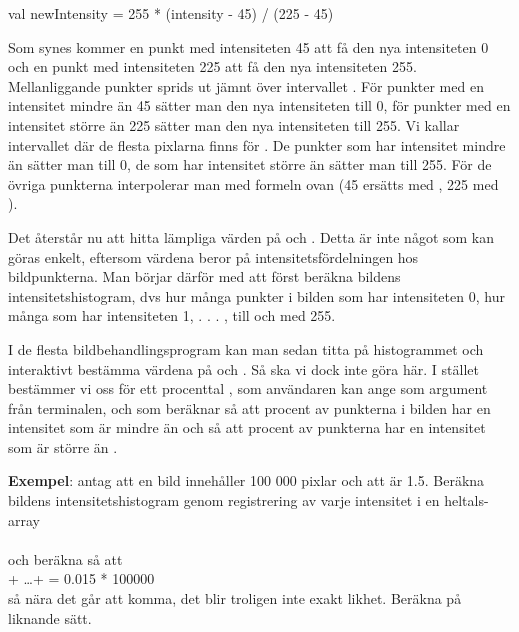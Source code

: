 \begin{Code}
val newIntensity = 255 * (intensity - 45) / (225 - 45)
\end{Code}

Som synes kommer en punkt med intensiteten 45 att få den nya intensiteten 0 och en punkt med intensiteten 225 att få den nya intensiteten 255. Mellanliggande punkter sprids ut jämnt över intervallet \code{[0, 255]}. För punkter med en intensitet mindre än 45 sätter man den nya intensiteten till 0, för punkter med en intensitet större än 225 sätter man den nya intensiteten till 255. Vi kallar intervallet där de flesta pixlarna finns för . De punkter som har intensitet mindre än  sätter man till 0, de som har intensitet större än  sätter man till 255. För de övriga punkterna interpolerar man med formeln ovan (45 ersätts med , 225 med ).

Det återstår nu att hitta lämpliga värden på  och . Detta är inte något som kan göras enkelt, eftersom värdena beror på intensitetsfördelningen hos bildpunkterna. Man börjar därför med att först beräkna bildens intensitetshistogram, dvs hur många punkter i bilden som har intensiteten 0, hur många som har intensiteten 1, . . . , till och med 255.

I de flesta bildbehandlingsprogram kan man sedan titta på histogrammet och interaktivt bestämma värdena på  och . Så ska vi dock inte göra här. I stället bestämmer vi oss för ett procenttal , som användaren kan ange som argument från terminalen, och som  beräknar  så att  procent av punkterna i bilden har en intensitet som är mindre än  och  så att  procent av punkterna har en intensitet som är större än .

\vspace{1em}

\noindent \textbf{Exempel}: antag att en bild innehåller 100 000 pixlar och att  är 1.5. Beräkna bildens intensitetshistogram genom registrering av varje intensitet i en heltals-array \\  \\och beräkna  så att \\ + \ldots +  = 0.015 * 100000 \\så nära det går att komma, det blir troligen inte exakt likhet. Beräkna  på liknande sätt.

